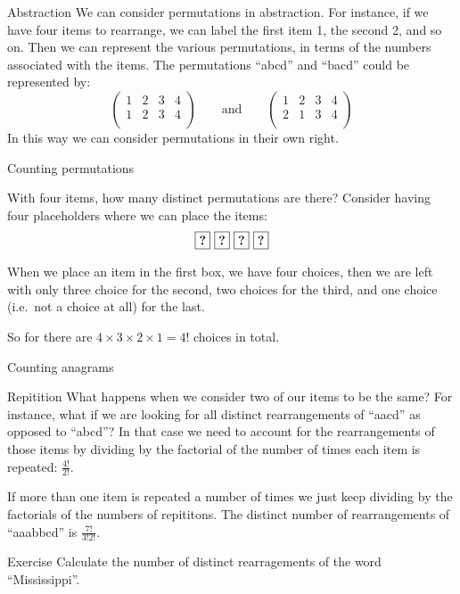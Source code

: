 \begin{frame}{Abstraction}
		We can consider permutations in abstraction.
		For instance, if we have four items to rearrange, we can label the first item 1, the second 2, and so on.
		Then we can represent the various permutations, in terms of the numbers associated with the items.
		The permutations ``abcd'' and ``bacd'' could be represented by:
			\[ \left( \begin{array}{cccc} 1 & 2 & 3 & 4 \\ 1 & 2 & 3 & 4 \\ \end{array} \right) 
    			\qquad \textrm{and} \qquad
         \left( \begin{array}{cccc} 1 & 2 & 3 & 4 \\ 2 & 1 & 3 & 4 \\ \end{array} \right) \]
		In this way we can consider permutations in their own right.
\end{frame}


\begin{frame}[fragile]{Counting permutations}
	\begin{block}{With four items, how many distinct permutations are there?}
		Consider having four placeholders where we can place the items:
		\[ \textbf{\fbox{?}} \  \textbf{\fbox{?}} \  \textbf{\fbox{?}} \  \textbf{\fbox{?}} \]
		
		When we place an item in the first box, we have four choices, then we are left with only three choice for the second, two choices for the third, and one choice (i.e.\ not a choice at all) for the last.

	So for there are $4 \times 3 \times 2 \times 1 = 4!$ choices in total.
	\end{block}


\end{frame}

\begin{frame}[fragile]{Counting anagrams}
	\begin{block}{Repitition}
		What happens when we consider two of our items to be the same?
		For instance, what if we are looking for all distinct rearrangements of ``aacd'' as opposed to ``abcd''?
	In that case we need to account for the rearrangements of those items by dividing by the factorial of the number of times each item is repeated: $\frac{4!}{2!}$.
	\end{block}
	
	If more than one item is repeated a number of times we just keep dividing by the factorials of the numbers of repititons.
	The distinct number of rearrangements of ``aaabbcd'' is $\frac{7!}{3!2!}$.

	\begin{block}{Exercise}
		Calculate the number of distinct rearragements of the word ``Mississippi''.
	\end{block}
\end{frame}


